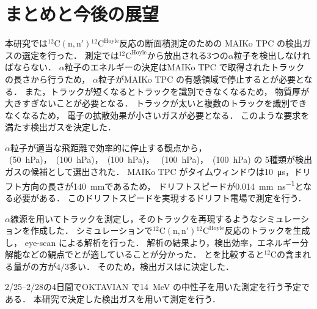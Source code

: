 \documentclass[../master]{subfiles}
\begin{document}
\chapter{まとめと今後の展望}
本研究では${}^{12}\mathrm{C}(\mathrm{n}, \mathrm{n}'){}^{12}\mathrm{C}^{\text{Hoyle}}$反応の断面積測定のための
MAIKo TPC の検出ガスの選定を行った．
測定では${}^{12}\mathrm{C}^{\text{Hoyle}}$から放出される3つの$\alpha$粒子を検出しなければならない．
$\alpha$粒子のエネルギーの決定はMAIKo TPC で取得されたトラックの長さから行うため，
$\alpha$粒子がMAIKo TPC の有感領域で停止するとが必要となる．
また，トラックが短くなるとトラックを識別できなくなるため，
物質厚が大きすぎないことが必要となる．
トラックが太いと複数のトラックを識別できなくなるため，
電子の拡散効果が小さいガスが必要となる．
このような要求を満たす検出ガスを決定した．

$\alpha$粒子が適当な飛距離で効率的に停止する観点から，
\Methane~(\SI{50}{\hecto\pascal})，\MethaneHydro~(\SI{100}{\hecto\pascal})，\MethaneHerium~(\SI{100}{\hecto\pascal})，
\isoButaneHydro~(\SI{100}{\hecto\pascal})，\isoButaneHerium~(\SI{100}{\hecto\pascal}) の
5種類が検出ガスの候補として選出された．
MAIKo TPC がタイムウィンドウは\SI{10}{\micro\second}，ドリフト方向の長さが\SI{140}{\milli\metre}であるため，
ドリフトスピードが\SI{0.014}{\milli\metre\per\nano\second}となる必要がある．
このドリフトスピードを実現するドリフト電場で測定を行う．

$\alpha$線源を用いてトラックを測定し，そのトラックを再現するようなシミュレーションを作成した．
シミュレーションで${}^{12}\mathrm{C}(\mathrm{n}, \mathrm{n}'){}^{12}\mathrm{C}^{\text{Hoyle}}$反応のトラックを生成し，
eye-scan による解析を行った．
解析の結果より，検出効率，エネルギー分解能などの観点で\MethaneHydro と\isoButaneHydro が適していることが分かった．
\MethaneHydro と\isoButaneHydro を比較すると${}^{12}\mathrm{C}$の含まれる量が\isoButaneHydro の方が$4/3$多い．
そのため，検出ガスは\isoButaneHydro に決定した．

2/25--2/28の4日間でOKTAVIAN で\SI{14}{\mega\electronvolt} の中性子を用いた測定を行う予定である．
本研究で決定した検出ガスを用いて測定を行う．
\end{document}
